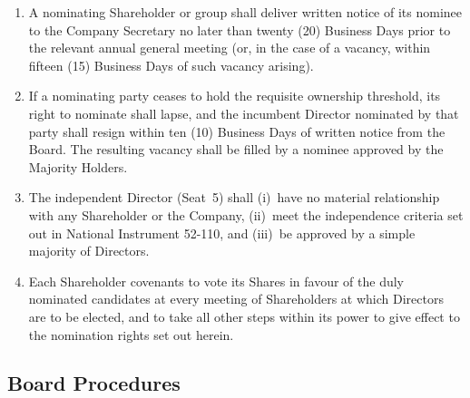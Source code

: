 \begin{enumerate}[leftmargin=*, label=\textbf{4.\arabic*.}, itemsep=5pt]
  \item A nominating Shareholder or group shall deliver written notice of its
        nominee to the Company Secretary no later than twenty (20) Business Days
        prior to the relevant annual general meeting (or, in the case of a vacancy,
        within fifteen (15) Business Days of such vacancy arising).

  \item If a nominating party ceases to hold the requisite ownership threshold,
        its right to nominate shall lapse, and the incumbent Director nominated by
        that party shall resign within ten (10) Business Days of written notice from
        the Board.  The resulting vacancy shall be filled by a nominee approved by
        the Majority Holders.

  \item The independent Director (Seat~5) shall (i)~have no material relationship
        with any Shareholder or the Company, (ii)~meet the independence criteria set
        out in National Instrument 52-110, and (iii)~be approved by a simple majority
        of Directors.

  \item Each Shareholder covenants to vote its Shares in favour of the duly nominated
        candidates at every meeting of Shareholders at which Directors are to be
        elected, and to take all other steps within its power to give effect to the
        nomination rights set out herein.
\end{enumerate}

\subsection{Board Procedures}

